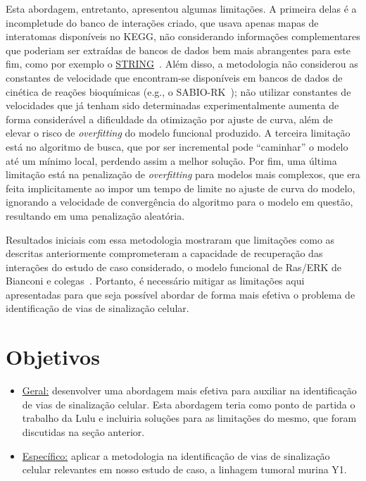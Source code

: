 \documentclass[12pt]{article}
\begin{document}
Esta abordagem, entretanto, apresentou algumas limitações. A primeira delas é a incompletude do banco de interações criado, que usava apenas mapas de interatomas disponíveis no KEGG, não considerando informações complementares que poderiam ser extraídas de bancos de dados bem mais abrangentes para este fim, como por exemplo o \href{https://string-db.org/}{STRING}~\cite{szklarczyk2010string}. Além disso, a metodologia não considerou as constantes de velocidade que encontram-se disponíveis em bancos de dados de cinética de reações bioquímicas (e.g., o SABIO-RK~\cite{doi:10.1093/nar/gkr1046}); não utilizar constantes de velocidades que já tenham sido determinadas experimentalmente aumenta de forma considerável a dificuldade da otimização por ajuste de curva, além de elevar o risco de {\em overfitting} do modelo funcional produzido. A terceira limitação está no algoritmo de busca, que por ser incremental pode ``caminhar'' o modelo até um mínimo local, perdendo assim a melhor solução. Por fim, uma última limitação está na penalização de {\em overfitting} para modelos mais complexos, que era feita implicitamente ao impor um tempo de limite no ajuste de curva do modelo, ignorando a velocidade de convergência do algoritmo para o modelo em questão, resultando em uma penalização aleatória.

Resultados iniciais com essa metodologia mostraram que limitações como as descritas anteriormente comprometeram a capacidade de recuperação das interações do estudo de caso considerado, o modelo funcional de Ras/ERK de Bianconi e colegas~\cite{Wu2015metodo,bianconi2012computational}. Portanto, é necessário mitigar as limitações aqui apresentadas para que seja possível abordar de forma mais efetiva o problema de identificação de vias de sinalização celular.


\section{Objetivos}

\begin{itemize}

\item \underline{Geral:} desenvolver uma abordagem mais efetiva para auxiliar na identificação de vias de sinalização celular. Esta abordagem teria como ponto de partida o trabalho da Lulu e incluiria soluções para as limitações do mesmo, que foram discutidas na seção anterior.

\item \underline{Específico:} aplicar a metodologia na identificação de vias de sinalização celular relevantes em nosso estudo de caso, a linhagem tumoral murina Y1.

\end{itemize}
\end{document}
